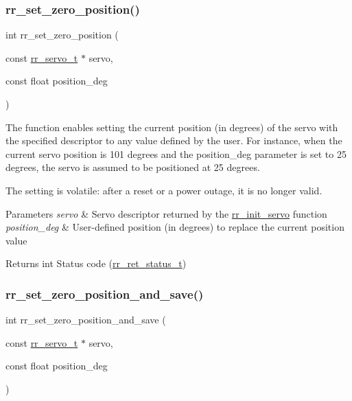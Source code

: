 \subsubsection{\texorpdfstring{rr\+\_\+set\+\_\+zero\+\_\+position()}{rr\_set\_zero\_position()}}
{\footnotesize\ttfamily int rr\+\_\+set\+\_\+zero\+\_\+position (\begin{DoxyParamCaption}\item[{const \hyperlink{structrr__servo__t}{rr\+\_\+servo\+\_\+t} $\ast$}]{servo,  }\item[{const float}]{position\+\_\+deg }\end{DoxyParamCaption})}



The function enables setting the current position (in degrees) of the servo with the specified descriptor to any value defined by the user. For instance, when the current servo position is 101 degrees and the \textquotesingle{}position\+\_\+deg\textquotesingle{} parameter is set to 25 degrees, the servo is assumed to be positioned at 25 degrees. 

The setting is volatile\+: after a reset or a power outage, it is no longer valid.


\begin{DoxyParams}{Parameters}
{\em servo} & Servo descriptor returned by the \hyperlink{group___common_ga0adb313a3eeb8a4399431e940a1f3e9e}{rr\+\_\+init\+\_\+servo} function \\
\hline
{\em position\+\_\+deg} & User-\/defined position (in degrees) to replace the current position value \\
\hline
\end{DoxyParams}
\begin{DoxyReturn}{Returns}
int Status code (\hyperlink{api_8h_a92d5be5038abcf89837faf85a08debdc}{rr\+\_\+ret\+\_\+status\+\_\+t}) 
\end{DoxyReturn}
\mbox{\label{group___servo__config_ga7ccc75e00e431b8a57150a71791488c3}} 
\subsubsection{\texorpdfstring{rr\+\_\+set\+\_\+zero\+\_\+position\+\_\+and\+\_\+save()}{rr\_set\_zero\_position\_and\_save()}}
{\footnotesize\ttfamily int rr\+\_\+set\+\_\+zero\+\_\+position\+\_\+and\+\_\+save (\begin{DoxyParamCaption}\item[{const \hyperlink{structrr__servo__t}{rr\+\_\+servo\+\_\+t} $\ast$}]{servo,  }\item[{const float}]{position\+\_\+deg }\end{DoxyParamCaption})}



